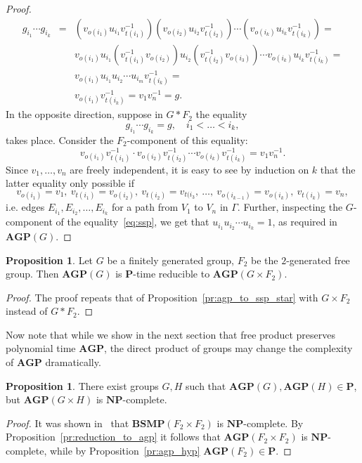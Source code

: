 \documentclass[10pt]{amsart}
\theoremstyle{definition}
\newtheorem{proposition}[theorem]{Proposition}
\def\P{{\mathbf{P}}}
\def\NP{{\mathbf{NP}}}
\def\BSMP{{\mathbf{BSMP}}}
\def\AGP{{\mathbf{AGP}}}
\begin{document}
\begin{proof}
\begin{eqnarray*}
g_{i_1}\cdots g_{i_k}&=&(v_{o(i_1)}u_{i_1}v_{t(i_1)}^{-1})
(v_{o(i_2)}u_{i_2}v_{t(i_2)}^{-1})\cdots (v_{o(i_k)}u_{i_k}v_{t(i_k)}^{-1})=\\
&&v_{o(i_1)}u_{i_1}(v_{t(i_1)}^{-1}
v_{o(i_2)})u_{i_2}(v_{t(i_2)}^{-1}v_{o(i_3)})\cdots v_{o(i_k)}u_{i_k}v_{t(i_k)}^{-1}=\\
&&v_{o(i_1)}u_{i_1}u_{i_2}\cdots u_{i_m}v_{t(i_k)}^{-1}=\\
&&v_{o(i_1)}v_{t(i_k)}^{-1}=v_{1}v_{n}^{-1}=g.
\end{eqnarray*}
In the opposite direction, suppose in $G\ast F_2$ the equality
\begin{equation}\label{eq:ssp}
g_{i_1}\cdots g_{i_k}=g,\quad i_1<\ldots<i_k,
\end{equation}
takes place. Consider the $F_2$-component of this equality:
$$
v_{o(i_1)}v_{t(i_1)}^{-1}\cdot v_{o(i_2)}v_{t(i_2)}^{-1}\cdots v_{o(i_k)}v_{t(i_k)}^{-1}=v_1v_n^{-1}.
$$
Since $v_1,\ldots, v_n$ are freely independent, it is easy to see by induction on $k$ that the latter equality only possible if
$$
v_{o(i_1)}=v_1,\ v_{t(i_1)}=v_{o(i_2)},\ v_{t(i_2)}=v_{t(i_3},\ \ldots,\ v_{o(i_{k-1})}=v_{o(i_k)},\ v_{t(i_k)}=v_n,
$$
i.e. edges $E_{i_1}, E_{i_2},\ldots, E_{i_k}$ for a path from $V_1$ to $V_n$ in $\Gamma$. Further, inspecting the $G$-component of the equality~\eqref{eq:ssp}, we get that $u_{i_1}u_{i_2}\cdots u_{i_k}=1$, as required in $\AGP(G)$.
\end{proof}

\begin{proposition}\label{pr:agp_to_ssp_cross}
Let $G$ be a finitely generated group, $F_2$ be the $2$-generated free group. Then $\AGP(G)$ is $\P$-time reducible to $\AGP(G\times F_2)$.
\end{proposition}
\begin{proof}
The proof repeats that of Proposition~\ref{pr:agp_to_ssp_star} with $G\times F_2$ instead of $G\ast F_2$.
\end{proof}


Now note that while we show in the next section that free product preserves polynomial time $\AGP$, the direct product of groups may change the complexity of $\AGP$ dramatically.
\begin{proposition}\label{pr:agp_cross}
There exist groups $G,H$ such that $\AGP(G),\AGP(H)\in\P$, but $\AGP(G\times H)$ is $\NP$-complete.
\end{proposition}
\begin{proof}
It was shown in~\cite[Theorem 7.4]{MNU1} that $\BSMP(F_2\times F_2)$ is $\NP$-complete. By Proposition~\ref{pr:reduction_to_agp} it follows that $\AGP(F_2\times F_2)$ is $\NP$-complete, while by Proposition~\ref{pr:agp_hyp} $\AGP(F_2)\in\P$.
\end{proof}
\end{document}
